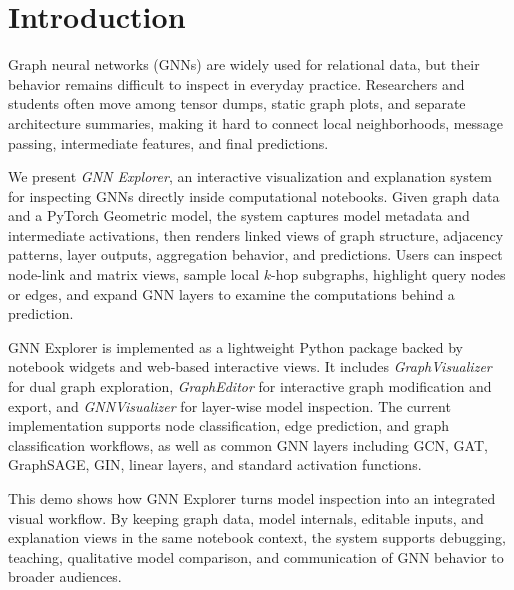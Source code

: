 \section{Introduction}

Graph neural networks (GNNs) are widely used for relational data, but their behavior remains difficult to inspect in everyday practice. Researchers and students often move among tensor dumps, static graph plots, and separate architecture summaries, making it hard to connect local neighborhoods, message passing, intermediate features, and final predictions.

We present \textit{GNN Explorer}, an interactive visualization and explanation system for inspecting GNNs directly inside computational notebooks. Given graph data and a PyTorch Geometric model, the system captures model metadata and intermediate activations, then renders linked views of graph structure, adjacency patterns, layer outputs, aggregation behavior, and predictions. Users can inspect node-link and matrix views, sample local $k$-hop subgraphs, highlight query nodes or edges, and expand GNN layers to examine the computations behind a prediction.

GNN Explorer is implemented as a lightweight Python package backed by notebook widgets and web-based interactive views. It includes \textit{GraphVisualizer} for dual graph exploration, \textit{GraphEditor} for interactive graph modification and export, and \textit{GNNVisualizer} for layer-wise model inspection. The current implementation supports node classification, edge prediction, and graph classification workflows, as well as common GNN layers including GCN, GAT, GraphSAGE, GIN, linear layers, and standard activation functions.

This demo shows how GNN Explorer turns model inspection into an integrated visual workflow. By keeping graph data, model internals, editable inputs, and explanation views in the same notebook context, the system supports debugging, teaching, qualitative model comparison, and communication of GNN behavior to broader audiences.
